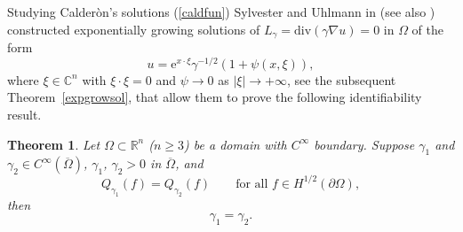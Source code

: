 \documentclass[10pt, a4paper, twoside, openright]{book}
\theoremstyle{definition}
\theoremstyle{plain}
\newtheorem{theorem}[subsection]{Theorem}
\theoremstyle{plain}
\theoremstyle{plain}
\theoremstyle{plain}
\theoremstyle{plain}
\theoremstyle{plain}
\theoremstyle{plain}
\theoremstyle{plain}
\begin{document}
Studying Calder\`on's solutions (\ref{caldfun}) Sylvester and Uhlmann in \cite{Sy-Uh}
(see also \cite{Sy-Uh86})
constructed exponentially growing solutions of $L_{\gamma}=\mathrm{div}(\gamma\nabla u)=0$
in $\Omega$ of the form
$$u=\mathrm{e}^{x\cdot\xi}\gamma^{-1/2}(1+\psi(x,\xi)),$$
where $\xi\in\mathbb{C}^n$ with $\xi\cdot\xi=0$
and $\psi\to0$ as $|\xi|\to+\infty$, see the subsequent Theorem~\ref{expgrowsol},
that allow them to prove the following identifiability result.

\begin{theorem}
\label{sy-ul-teo}
Let $\Omega\subset\mathbb{R}^n$ ($n\geq3$) be a domain with
$C^{\infty}$ boundary. Suppose $\gamma_1$ and
$\gamma_2\in C^{\infty}(\overline{\Omega})$,
$\gamma_1$, $\gamma_2>0$ in $\overline{\Omega}$, and
\begin{equation}
\label{1=2}
Q_{\gamma_1}(f)=Q_{\gamma_2}(f)\qquad\textrm{for all }
f\in H^{1/2}(\partial\Omega),
\end{equation}
then
$$\gamma_1=\gamma_2.$$
\end{theorem}
\end{document}

